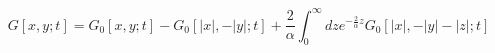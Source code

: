 \begin{equation}
\label{eucli2}
G[x, y; t] = G_0[x, y; t] - G_0[|x|, -|y|; t] + 
\frac{2}{\alpha} \int_0^{\infty} dz e^{-\frac{2}{\alpha} z}
G_0[|x|, -|y|-|z|; t]
\end{equation}

